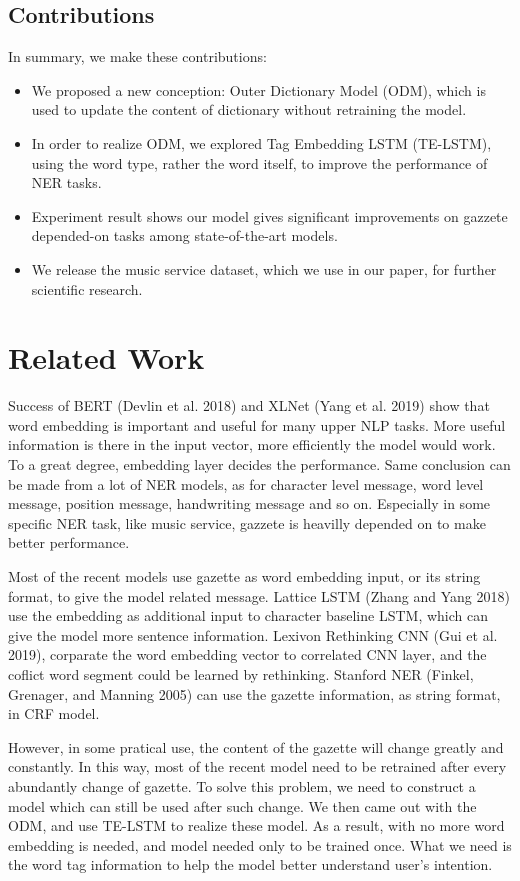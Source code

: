 \documentclass[letterpaper]{article} %
\begin{document}
\subsection{Contributions}

In summary, we make these contributions:

\begin{itemize}
\item We proposed a new conception: Outer Dictionary Model (ODM), which is used to update the content of dictionary without retraining the model.
\item In order to realize ODM, we explored Tag Embedding LSTM (TE-LSTM), using the word type, rather the word itself, to improve the performance of NER tasks.
\item Experiment result shows our model gives significant improvements on gazzete depended-on tasks among state-of-the-art models.
\item We release the music service dataset, which we use in our paper, for further scientific research.
\end{itemize}

\section{Related Work}
Success of BERT (Devlin et al. 2018) and XLNet (Yang et al. 2019) show that word embedding is important and useful for many upper NLP tasks. More useful information is there in the input vector, more efficiently the model would work. To a great degree, embedding layer decides the performance. Same conclusion can be made from a lot of NER models, as for character level message, word level message, position message, handwriting message and so on. Especially in some specific NER task, like music service,	 gazzete is heavilly depended on to make better performance. 

Most of the recent models use gazette as word embedding input, or its string format, to give the model related message. Lattice LSTM (Zhang and Yang 2018) use the embedding as additional input to character baseline LSTM, which can give the model more sentence information. Lexivon Rethinking CNN (Gui et al. 2019), corparate the word embedding vector to correlated CNN layer, and the coflict word segment could be learned by rethinking. Stanford NER (Finkel, Grenager, and Manning 2005) can use the gazette information, as string format, in CRF model.

However, in some pratical use, the content of the gazette will change greatly and constantly. In this way, most of the recent model need to be retrained after every abundantly change of gazette. To solve this problem, we need to construct a model which can still be used after such change. We then came out with the ODM, and use TE-LSTM to realize these model. As a result, with no more word embedding is needed, and model needed only to be trained once.  What we need is the word tag information to help the model better understand user's intention.
\end{document}
